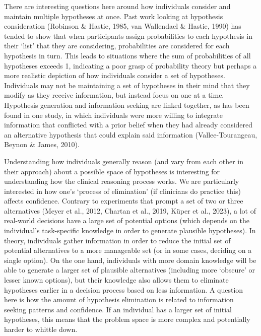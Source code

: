 \documentclass[a4paper, nobind]{templates/ociamthesis}
\begin{document}
\hfill\break
There are interesting questions here around how individuals consider and maintain multiple hypotheses at once. Past work looking at hypothesis consideration (Robinson \& Hastie, 1985, van Wallendael \& Hastie, 1990) has tended to show that when participants assign probabilities to each hypothesis in their `list' that they are considering, probabilities are considered for each hypothesis in turn. This leads to situations where the sum of probabilities of all hypotheses exceeds 1, indicating a poor grasp of probability theory but perhaps a more realistic depiction of how individuals consider a set of hypotheses. Individuals may not be maintaining a set of hypotheses in their mind that they modify as they receive information, but instead focus on one at a time. Hypothesis generation and information seeking are linked together, as has been found in one study, in which individuals were more willing to integrate information that conflicted with a prior belief when they had already considered an alternative hypothesis that could explain said information (Vallee-Tourangeau, Beynon \& James, 2010).

\hfill\break
Understanding how individuals generally reason (and vary from each other in their approach) about a possible space of hypotheses is interesting for understanding how the clinical reasoning process works. We are particularly interested in how one's `process of elimination' (if clinicians do practice this) affects confidence. Contrary to experiments that prompt a set of two or three alternatives (Meyer et al., 2012, Chartan et al., 2019, Küper et al., 2023), a lot of real-world decisions have a large set of potential options (which depends on the individual's task-specific knowledge in order to generate plausible hypotheses). In theory, individuals gather information in order to reduce the initial set of potential alternatives to a more manageable set (or in some cases, deciding on a single option). On the one hand, individuals with more domain knowledge will be able to generate a larger set of plausible alternatives (including more `obscure' or lesser known options), but their knowledge also allows them to eliminate hypotheses earlier in a decision process based on less information. A question here is how the amount of hypothesis elimination is related to information seeking patterns and confidence. If an individual has a larger set of initial hypotheses, this means that the problem space is more complex and potentially harder to whittle down.
\end{document}
